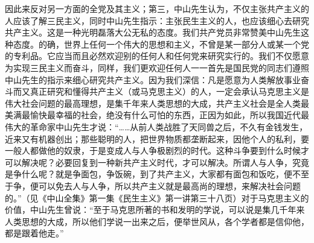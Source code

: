 因此来反对另一方面的全党及其主义；第三，中山先生认为，不仅主张共产主义的人应该了解三民主义，同时中山先生指示：主张民生主义的人，也应该细心去研究共产主义。这是一种光明磊落大公无私的态度。我们共产党员非常赞美中山先生这种态度。的确，世界上任何一个伟大的思想和主义，不曾是某一部分人或某一个党的专利品。它应当而且必然欢迎别的任何人和任何党来研究实行的。我们不仅愿意为实现三民主义而奋斗，同样，我们更欢迎任何人一一首先是国民党的同志们遵照中山先生的指示来细心研究共产主义。因为我们深信：凡是愿意为人类解放事业奋斗而又真正研究和懂得共产主义（或马克思主义）的人，一定会承认马克思主义是伟大社会问题的最高理想，是集千年来人类思想的大成，共产主义社会是全人类最美满最愉快最幸福的社会，绝没有什么可怕的东西，正因为如此，所以我国近代最伟大的革命家中山先生才说：“……从前人类战胜了天同兽之后，不久有金钱发生，近来又有机器创出；那些聪明的人，把世界物质都垄断起来，因他个人的私利，要一般人都做他的奴隶，于是变成人与人争极剧烈的时代。这种斗争要到什么时候才可以解决呢？必要回复到一种新共产主义时代，才可以解决。所谓人与人争，究竟是争什么呢？就是争面包，争饭碗，到了共产主义，大家都有面包和饭吃，便不至于争，便可以免去人与人争，所以共产主义就是最高尚的理想，来解决社会问题的。”（见《中山全集》第一集《民生主义》第一讲第三十八页）对于马克思主义的价值，中山先生曾说：“至于马克思所著的书和发明的学说，可以说是集几千年来人类思想的大成，所以他们学说一出来之后，便举世风从，各个学者都是信仰他，都是跟着他走。”

